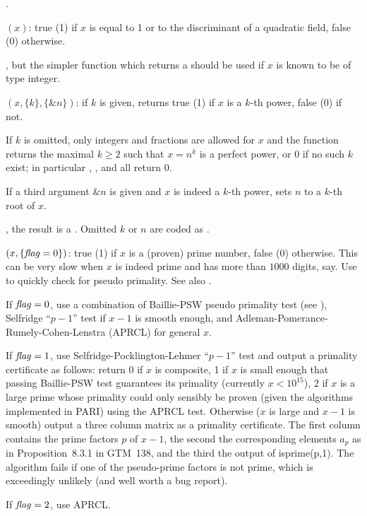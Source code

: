 .

$(x)$: true (1) if $x$ is equal to 1 or to the
discriminant of a quadratic field, false (0) otherwise.

, but the simpler function 
which returns a  should be used if $x$ is known to be of type
integer.

$(x,\{k\}, \{\&n\})$:
if $k$ is given, returns true (1) if $x$ is a $k$-th power, false
(0) if not.

If $k$ is omitted, only integers and fractions are allowed for $x$ and the
function returns the maximal $k \geq 2$ such that $x = n^k$ is a perfect
power, or 0 if no such $k$ exist; in particular ,
, and  all return $0$.

If a third argument $\&n$ is given and $x$ is indeed a $k$-th power, sets
$n$ to a $k$-th root of $x$.

, the result is a . Omitted $k$ or $n$
are coded as .

$(x,\{\hbox{\it f\kern0pt lag\/}=0\})$: true (1) if $x$ is a (proven) prime
number, false (0) otherwise. This can be very slow when $x$ is indeed
prime and has more than $1000$ digits, say. Use  to
quickly check for pseudo primality. See also .

If $\hbox{\it f\kern0pt lag\/}=0$, use a combination of Baillie-PSW pseudo primality test (see
), Selfridge ``$p-1$'' test if $x-1$ is smooth enough, and
Adleman-Pomerance-Rumely-Cohen-Lenstra (APRCL) for general $x$.

If $\hbox{\it f\kern0pt lag\/}=1$, use Selfridge-Pocklington-Lehmer ``$p-1$'' test and output a
primality certificate as follows: return 0 if $x$ is composite, 1 if $x$ is
small enough that passing Baillie-PSW test guarantees its primality
(currently $x < 10^{15}$), $2$ if $x$ is a large prime whose primality could
only sensibly be proven (given the algorithms implemented in PARI) using the
APRCL test. Otherwise ($x$ is large and $x-1$ is smooth) output a three
column matrix as a primality certificate. The first column contains the prime
factors $p$ of $x-1$, the second the corresponding elements $a_p$ as in
Proposition~8.3.1 in GTM~138, and the third the output of isprime(p,1). The
algorithm fails if one of the pseudo-prime factors is not prime, which is
exceedingly unlikely (and well worth a bug report).

If $\hbox{\it f\kern0pt lag\/}=2$, use APRCL.

